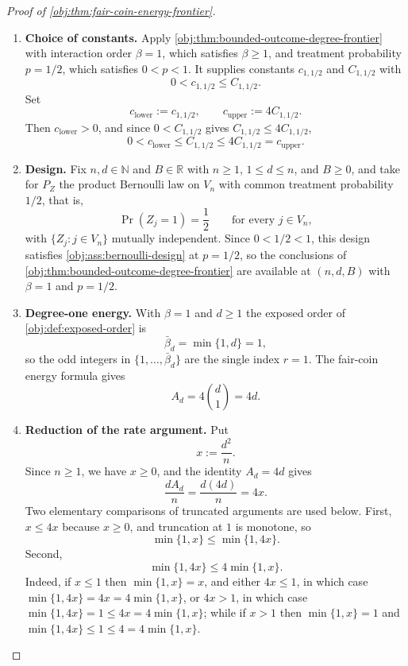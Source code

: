\documentclass[11pt]{article}
\begin{document}
\begin{proof}[Proof of \cref{obj:thm:fair-coin-energy-frontier}]
\begin{enumerate}
\item \textbf{Choice of constants.}
Apply \cref{obj:thm:bounded-outcome-degree-frontier} with interaction order \(\beta=1\), which satisfies \(\beta\ge1\), and treatment probability \(p=1/2\), which satisfies \(0<p<1\).  It supplies constants \(c_{1,1/2}\) and \(C_{1,1/2}\) with
\[
0<c_{1,1/2}\le C_{1,1/2}.
\]
Set
\[
c_{\mathrm{lower}}:=c_{1,1/2},
\qquad
c_{\mathrm{upper}}:=4C_{1,1/2}.
\]
Then \(c_{\mathrm{lower}}>0\), and since \(0<C_{1,1/2}\) gives \(C_{1,1/2}\le4C_{1,1/2}\),
\[
0<c_{\mathrm{lower}}\le C_{1,1/2}\le 4C_{1,1/2}=c_{\mathrm{upper}}.
\] %

\item \textbf{Design.}
Fix \(n,d\in\mathbb N\) and \(B\in\mathbb R\) with \(n\ge1\), \(1\le d\le n\), and \(B\ge0\), and take for \(P_Z\) the product Bernoulli law on \(V_n\) with common treatment probability \(1/2\), that is,
\[
\Pr(Z_j=1)=\frac12
\qquad\text{for every }j\in V_n,
\]
with \(\{Z_j:j\in V_n\}\) mutually independent.  Since \(0<1/2<1\), this design satisfies \cref{obj:ass:bernoulli-design} at \(p=1/2\), so the conclusions of \cref{obj:thm:bounded-outcome-degree-frontier} are available at \((n,d,B)\) with \(\beta=1\) and \(p=1/2\). %

\item \textbf{Degree-one energy.}
With \(\beta=1\) and \(d\ge1\) the exposed order of \cref{obj:def:exposed-order} is
\[
\bar\beta_d=\min\{1,d\}=1,
\]
so the odd integers in \(\{1,\ldots,\bar\beta_d\}\) are the single index \(r=1\).  The fair-coin energy formula gives
\[
A_d
=
4\binom d1
=
4d.
\] %

\item \textbf{Reduction of the rate argument.}
Put
\[
x:=\frac{d^2}{n}.
\]
Since \(n\ge1\), we have \(x\ge0\), and the identity \(A_d=4d\) gives
\[
\frac{dA_d}{n}
=
\frac{d(4d)}{n}
=
4x.
\]
Two elementary comparisons of truncated arguments are used below.  First, \(x\le4x\) because \(x\ge0\), and truncation at \(1\) is monotone, so
\[
\min\{1,x\}\le\min\{1,4x\}.
\]
Second,
\[
\min\{1,4x\}\le4\min\{1,x\}.
\]
Indeed, if \(x\le1\) then \(\min\{1,x\}=x\), and either \(4x\le1\), in which case \(\min\{1,4x\}=4x=4\min\{1,x\}\), or \(4x>1\), in which case \(\min\{1,4x\}=1\le4x=4\min\{1,x\}\); while if \(x>1\) then \(\min\{1,x\}=1\) and \(\min\{1,4x\}\le1\le4=4\min\{1,x\}\). %


\end{enumerate}
\end{proof}
\end{document}
